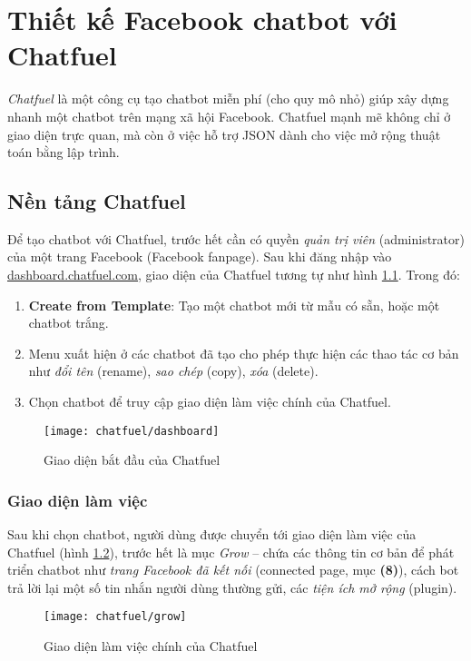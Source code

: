 \chapter{Thiết kế Facebook chatbot với Chatfuel}
\textit{Chatfuel} là một công cụ tạo chatbot miễn phí (cho quy mô nhỏ) giúp xây dựng nhanh một chatbot trên mạng xã hội Facebook. Chatfuel mạnh mẽ không chỉ ở giao diện trực quan, mà còn ở việc hỗ trợ JSON dành cho việc mở rộng thuật toán bằng lập trình.\par

\section{Nền tảng Chatfuel}
Để tạo chatbot với Chatfuel, trước hết cần có quyền \textit{quản trị viên} (administrator) của một trang Facebook (Facebook fanpage). Sau khi đăng nhập vào {\color{mTeal}\underline{dashboard.chatfuel.com}}, giao diện của Chatfuel tương tự như hình \ref{fig:fig-s3-1-chatfuel-dashboard}. Trong đó:
\begin{enumerate}[label=\textbf{(\arabic*)},align=left,left=0cm..0cm,itemindent=*]
	\item \textbf{Create from Template}: Tạo một chatbot mới từ mẫu có sẵn, hoặc một chatbot trắng.
	\item Menu xuất hiện ở các chatbot đã tạo cho phép thực hiện các thao tác cơ bản như \textit{đổi tên} (rename), \textit{sao chép} (copy), \textit{xóa} (delete).
	\item Chọn chatbot để truy cập giao diện làm việc chính của Chatfuel.
\end{enumerate}\par

\begin{figure}[htb!]\centering
	\texttt{[image: chatfuel/dashboard]}
	\caption{Giao diện bắt đầu của Chatfuel}
	\label{fig:fig-s3-1-chatfuel-dashboard}
\end{figure}\par

\subsection{Giao diện làm việc}
Sau khi chọn chatbot, người dùng được chuyển tới giao diện làm việc của Chatfuel (hình \ref{fig:fig-s3-1-chatfuel-grow}), trước hết là mục \textit{Grow} – chứa các thông tin cơ bản để phát triển chatbot như \textit{trang Facebook đã kết nối} (connected page, mục \textbf{(8)}), cách bot trả lời lại một số tin nhắn người dùng thường gửi, các \textit{tiện ích mở rộng} (plugin).\par
\begin{figure}[htb!]\centering
	\texttt{[image: chatfuel/grow]}
	\caption{Giao diện làm việc chính của Chatfuel}
	\label{fig:fig-s3-1-chatfuel-grow}
\end{figure}\par

